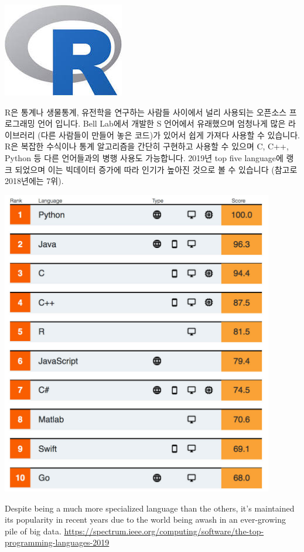 \documentclass[
]{book}
\begin{document}
\includegraphics{images/01/r.jpg}

R은 통계나 생물통계, 유전학을 연구하는 사람들 사이에서 널리 사용되는 오픈소스 프로그래밍 언어 입니다. Bell Lab에서 개발한 S 언어에서 유래했으며 엄청나게 많은 라이브러리 (다른 사람들이 만들어 놓은 코드)가 있어서 쉽게 가져다 사용할 수 있습니다. R은 복잡한 수식이나 통계 알고리즘을 간단히 구현하고 사용할 수 있으며 C, C++, Python 등 다른 언어들과의 병행 사용도 가능합니다. 2019년 top five language에 랭크 되었으며 이는 빅데이터 증가에 따라 인기가 높아진 것으로 볼 수 있습니다 (참고로 2018년에는 7위).

\includegraphics[width=4.6875in,height=\textheight]{images/01/topproglang.jpeg}

Despite being a much more specialized language than the others, it's maintained its popularity in recent years due to the world being awash in an ever-growing pile of big data.
\url{https://spectrum.ieee.org/computing/software/the-top-programming-languages-2019}
\end{document}
